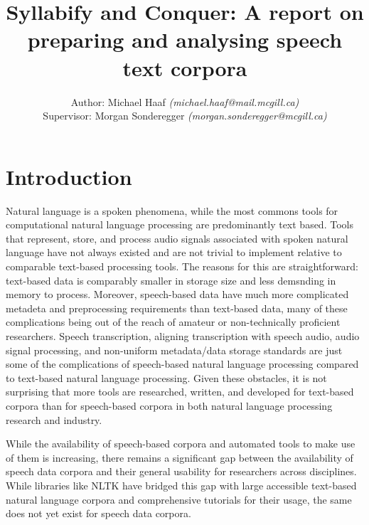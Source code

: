 \documentclass[11pt]{article}
\begin{document}
\title{Syllabify and Conquer: A report on preparing and analysing speech text corpora}
\author{Author: Michael Haaf \textit{(michael.haaf@mail.mcgill.ca)} \\ Supervisor: Morgan Sonderegger \textit{(morgan.sonderegger@mcgill.ca)}}

\maketitle
\begin{singlespace}
\tableofcontents
\end{singlespace}
\newpage

\section{Introduction}

\nocite{*}

Natural language is a spoken phenomena, while the most commons tools for computational natural language processing are predominantly text based. Tools that represent, store, and process audio signals associated with spoken natural language have not always existed and are not trivial to implement relative to comparable text-based processing tools. The reasons for this are straightforward: text-based data is comparably smaller in storage size and less demsnding in memory to process. Moreover, speech-based data have much more complicated metadeta and preprocessing requirements than text-based data, many of these complications being out of the reach of amateur or non-technically proficient researchers. Speech transcription, aligning transcription with speech audio, audio signal processing, and non-uniform metadata/data storage standards are just some of the complications of speech-based natural language processing compared to text-based natural language processing. Given these obstacles, it is not surprising that more tools are researched, written, and developed for text-based corpora than for speech-based corpora in both natural language processing research and industry.

While the availability of speech-based corpora and automated tools to make use of them is increasing\cite{mcauliffe_polyglot_2017}, there remains a significant gap between the availability of speech data corpora and their general usability for researchers across disciplines. While libraries like NLTK\cite{noauthor_nltk_nodate} have bridged this gap with large accessible text-based natural language corpora and comprehensive tutorials for their usage, the same does not yet exist for speech data corpora.
\end{document}
